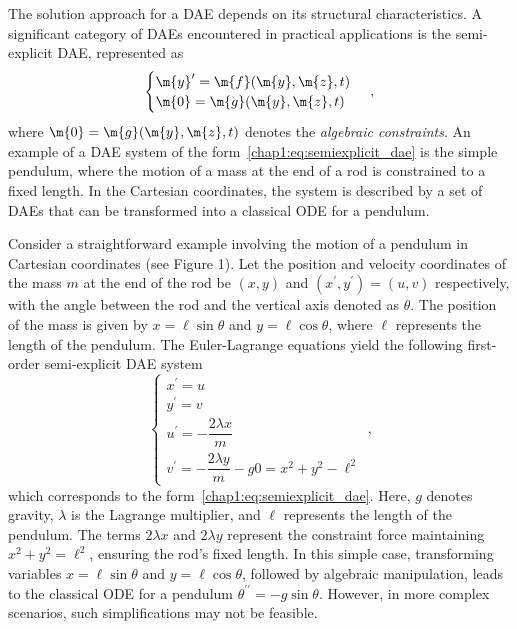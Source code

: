 The solution approach for a \ac{DAE} depends on its structural characteristics. A significant category of \acp{DAE} encountered in practical applications is the semi-explicit \ac{DAE}, represented as
%
\begin{equation}
  \begin{cases}
    \m{y}^{\prime} = \m{f}(\m{y}, \m{z}, t) \\
    \m{0} = \m{g}(\m{y}, \m{z}, t)
  \end{cases} \, \text{,}
  \label{chap1:eq:semiexplicit_dae}
\end{equation}
%
where $\m{0} = \m{g}(\m{y}, \m{z}, t)$ denotes the \emph{algebraic constraints}. An example of a \ac{DAE} system of the form~\eqref{chap1:eq:semiexplicit_dae} is the simple pendulum, where the motion of a mass at the end of a rod is constrained to a fixed length. In the Cartesian coordinates, the system is described by a set of \acp{DAE} that can be transformed into a classical \ac{ODE} for a pendulum.
%
\begin{example}
  Consider a straightforward example involving the motion of a pendulum in Cartesian coordinates (see Figure 1). Let the position and velocity coordinates of the mass $m$ at the end of the rod be $(x, y)$ and $(x^{\prime}, y^{\prime}) = (u, v)$ respectively, with the angle between the rod and the vertical axis denoted as $\theta$. The position of the mass is given by $x = \ell\sin{\theta}$ and $y = \ell\cos{\theta}$, where $\ell$ represents the length of the pendulum. The Euler-Lagrange equations yield the following first-order semi-explicit \ac{DAE} system
  \begin{equation*}
    \begin{cases}
      x^{\prime} = u \\
      y^{\prime} = v \\
      u^{\prime} = -\dfrac{2 \lambda x}{m} \\
      v^{\prime} = -\dfrac{2 \lambda y}{m} - g
      0 = x^2 + y^2 - \ell^2
    \end{cases} \, \text{,}
  \end{equation*}
  which corresponds to the form~\eqref{chap1:eq:semiexplicit_dae}. Here, $g$ denotes gravity, $\lambda$ is the Lagrange multiplier, and $\ell$ represents the length of the pendulum. The terms $2 \lambda x$ and $2 \lambda y$ represent the constraint force maintaining $x^2 + y^2 = \ell^2$, ensuring the rod's fixed length. In this simple case, transforming variables $x = \ell\sin{\theta}$ and $y = \ell\cos{\theta}$, followed by algebraic manipulation, leads to the classical \ac{ODE} for a pendulum $\theta^{\prime\prime} = -g\sin{\theta}$. However, in more complex scenarios, such simplifications may not be feasible.
\end{example}

